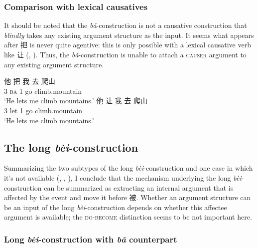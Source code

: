 \documentclass[UTF8, a4paper, oneside, scheme=plain, 12pt]{ctexrep}
\newcommand{\form}[1]{\emph{#1}}
\newcommand{\translate}[1]{`#1'}
\newcommand*{\category}[1]{\textsc{#1}}
\begin{document}
\subsubsection{Comparison with lexical causatives}\label{sec:verb-phrase.object.ba.causative}


It should be noted that the \form{bǎ}-construction is not
a causative construction that \emph{blindly} takes any existing argument structure as the input.
It seems what appears after 把 is never quite agentive:
this is only possible with a lexical causative verb like 让
(, ).
Thus, the \form{bǎ}-construction is unable to attach a \category{causer} argument 
to any existing argument structure. 

\begin{exe}
    \ex\label{ex:verb-phrase.ba.2} \gll * 他 把 我 去 爬山 \\
    {} 3 \category{ba} 1 go climb.mountain \\
    \glt \translate{He lets me climb mountains.}
    \ex\label{ex:verb-phrase.ba.correct-2} \gll 他 让 我 去 爬山 \\
    3 let 1 go climb.mountain \\
    \glt \translate{He lets me climb mountains.}
\end{exe}

\subsection{The long \form{bèi}-construction}\label{sec:verb-phrase.bei}

Summarizing the two subtypes of the long \form{bèi}-construction
and one case in which it's not available
(,
,
),
I conclude that the mechanism underlying the long \form{bèi}-construction
can be summarized as 
extracting an internal argument that is affected by the event 
and move it before 被.
Whether an argument structure can be an input of the long \form{bèi}-construction
depends on whether this affectee argument is available;
the \category{do}-\category{become} distinction seems to be not important here.

\subsubsection{Long \form{bèi}-construction with \form{bǎ} counterpart}
\label{sec:verb-phrase.bei.ba}
\end{document}
